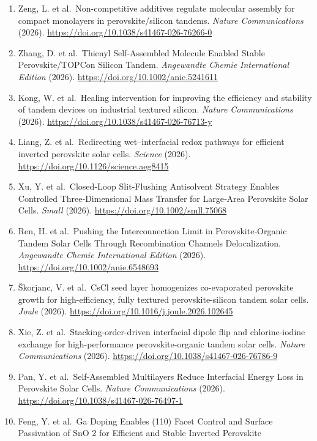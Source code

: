 \documentclass[
  11pt,
]{article}
\providecommand{\tightlist}{%
  \setlength{\itemsep}{0pt}\setlength{\parskip}{0pt}}
\begin{document}
\begin{enumerate}
\def\labelenumi{\arabic{enumi}.}
\tightlist
\item
  Zeng, L. et al.~Non-competitive additives regulate molecular assembly
  for compact monolayers in perovskite/silicon tandems. \emph{Nature
  Communications} (2026).
  \url{https://doi.org/10.1038/s41467-026-76266-0}
\item
  Zhang, D. et al.~Thienyl Self‐Assembled Molecule Enabled Stable
  Perovskite/TOPCon Silicon Tandem. \emph{Angewandte Chemie
  International Edition} (2026).
  \url{https://doi.org/10.1002/anie.5241611}
\item
  Kong, W. et al.~Healing intervention for improving the efficiency and
  stability of tandem devices on industrial textured silicon.
  \emph{Nature Communications} (2026).
  \url{https://doi.org/10.1038/s41467-026-76713-y}
\item
  Liang, Z. et al.~Redirecting wet--interfacial redox pathways for
  efficient inverted perovskite solar cells. \emph{Science} (2026).
  \url{https://doi.org/10.1126/science.aeg8415}
\item
  Xu, Y. et al.~Closed‐Loop Slit‐Flushing Antisolvent Strategy Enables
  Controlled Three‐Dimensional Mass Transfer for Large‐Area Perovskite
  Solar Cells. \emph{Small} (2026).
  \url{https://doi.org/10.1002/smll.75068}
\item
  Ren, H. et al.~Pushing the Interconnection Limit in Perovskite‐Organic
  Tandem Solar Cells Through Recombination Channels Delocalization.
  \emph{Angewandte Chemie International Edition} (2026).
  \url{https://doi.org/10.1002/anie.6548693}
\item
  Škorjanc, V. et al.~CsCl seed layer homogenizes co-evaporated
  perovskite growth for high-efficiency, fully textured
  perovskite-silicon tandem solar cells. \emph{Joule} (2026).
  \url{https://doi.org/10.1016/j.joule.2026.102645}
\item
  Xie, Z. et al.~Stacking-order-driven interfacial dipole flip and
  chlorine-iodine exchange for high-performance perovskite-organic
  tandem solar cells. \emph{Nature Communications} (2026).
  \url{https://doi.org/10.1038/s41467-026-76786-9}
\item
  Pan, Y. et al.~Self-Assembled Multilayers Reduce Interfacial Energy
  Loss in Perovskite Solar Cells. \emph{Nature Communications} (2026).
  \url{https://doi.org/10.1038/s41467-026-76497-1}
\item
  Feng, Y. et al.~Ga Doping Enables (110) Facet Control and Surface
  Passivation of SnO 2 for Efficient and Stable Inverted Perovskite

\end{enumerate}
\end{document}
